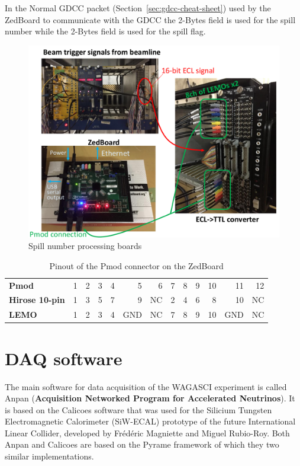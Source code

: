 In the Normal GDCC packet (Section~\ref{sec:gdcc-cheat-sheet}) used by the
ZedBoard to communicate with the GDCC the 2-Bytes  field
is used for the spill number while the 2-Bytes 
field is used for the spill flag.
\begin{figure}[H]
  \centering \includegraphics[width=\linewidth]{cables-spill-number}
  \caption{Spill number processing boards}\label{fig:cables-spill-number}
\end{figure}
\begin{table}[H]
  \centering
  \begin{tabular}{|l|r r r r r r r r r r r r|}
    \hline
    \textbf{Pmod} & 1 & 2 & 3 & 4 & 5 & 6 & 7 & 8 & 9 & 10 & 11 & 12 \\
    \textbf{Hirose 10-pin} & 1 & 3 & 5 & 7 & 9 & NC & 2 & 4 & 6 & 8 & 10 & NC\\
    \textbf{LEMO} & 1 & 2 & 3 & 4 & GND & NC & 7 & 8 & 9 & 10 & GND & NC \\
    \hline
  \end{tabular}
  \caption{Pinout of the Pmod connector on the ZedBoard}
\end{table}


\chapter{DAQ software}
The main software for data acquisition of the WAGASCI experiment is called Anpan
(\textbf{Acquisition Networked Program for Accelerated Neutrinos}). It is based
on the Calicoes software that was used for the Silicium Tungsten Electromagnetic
Calorimeter (SiW-ECAL) prototype of the future International Linear Collider,
developed by Frédéric Magniette and Miguel Rubio-Roy. Both Anpan and Calicoes
are based on the Pyrame framework of which they two similar implementations.

